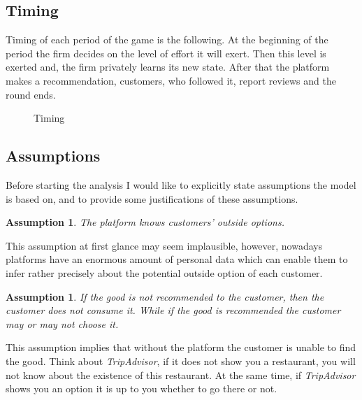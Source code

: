 \documentclass[a4paper]{article}
\newtheorem{assumption}[theorem]{Assumption}
\begin{document}
	\subsection{Timing}
	Timing of each period of the game is the following. At the beginning of the period the firm decides on the level of effort it will exert. Then this level is exerted and, the firm privately learns its new state. After that the platform makes a recommendation, customers, who followed it, report reviews and the round ends. 
	\begin{center}
	\begin{figure}[H]
	\caption{Timing}\label{fig1}
	\end{figure}
\end{center}
 	\subsection{Assumptions}
 	Before starting the analysis I would like to explicitly state assumptions the model is based on, and to provide some justifications of these assumptions.
 	\begin{assumption}
 		The platform knows customers' outside options.
 	\end{assumption}
 	This assumption at first glance may seem implausible, however, nowadays platforms have an enormous amount of personal data which can enable them to infer rather precisely about the potential outside option of each customer.
 	
 	\begin{assumption}
 		If the good is not recommended to the customer, then the customer does not consume it. While if the good is recommended the customer may or may not choose it.
 	\end{assumption}
 	This assumption implies that without the platform the customer is unable to find the good. Think about \textit{TripAdvisor}, if it does not show you a restaurant, you will not know about the existence of this restaurant. At the same time, if \textit{TripAdvisor} shows you an option it is up to you whether to go there or not. 
\end{document}
